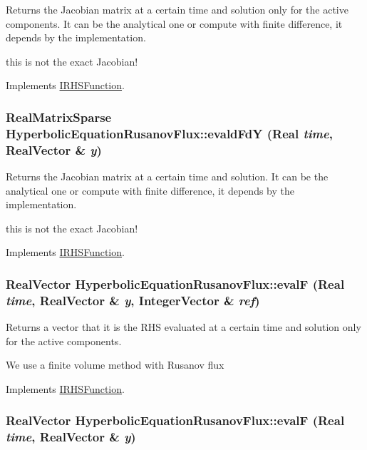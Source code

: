 Returns the Jacobian matrix at a certain time and solution only for the active components. It can be the analytical one or compute with finite difference, it depends by the implementation. 

this is not the exact Jacobian!

Implements \hyperlink{classIRHSFunction}{IRHSFunction}.\hypertarget{classHyperbolicEquationRusanovFlux_a401392a4b37dd6ec8a15817f37936d1b}{
\subsubsection[{evaldFdY}]{\setlength{\rightskip}{0pt plus 5cm}RealMatrixSparse HyperbolicEquationRusanovFlux::evaldFdY (Real {\em time}, \/  RealVector \& {\em y})}}
\label{classHyperbolicEquationRusanovFlux_a401392a4b37dd6ec8a15817f37936d1b}


Returns the Jacobian matrix at a certain time and solution. It can be the analytical one or compute with finite difference, it depends by the implementation. 

this is not the exact Jacobian!

Implements \hyperlink{classIRHSFunction}{IRHSFunction}.\hypertarget{classHyperbolicEquationRusanovFlux_ad7ae556cb8b48064d77163d554d83396}{
\subsubsection[{evalF}]{\setlength{\rightskip}{0pt plus 5cm}RealVector HyperbolicEquationRusanovFlux::evalF (Real {\em time}, \/  RealVector \& {\em y}, \/  IntegerVector \& {\em ref})}}
\label{classHyperbolicEquationRusanovFlux_ad7ae556cb8b48064d77163d554d83396}


Returns a vector that it is the RHS evaluated at a certain time and solution only for the active components. 

We use a finite volume method with Rusanov flux 

Implements \hyperlink{classIRHSFunction}{IRHSFunction}.\hypertarget{classHyperbolicEquationRusanovFlux_a32c91624ae05d626535a45b12776ef9b}{
\subsubsection[{evalF}]{\setlength{\rightskip}{0pt plus 5cm}RealVector HyperbolicEquationRusanovFlux::evalF (Real {\em time}, \/  RealVector \& {\em y})}}
\label{classHyperbolicEquationRusanovFlux_a32c91624ae05d626535a45b12776ef9b}


